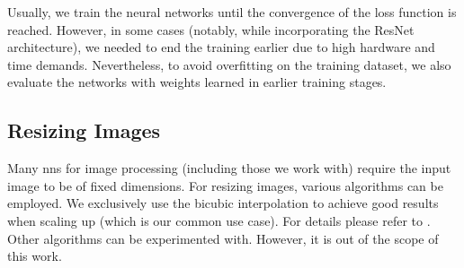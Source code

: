 Usually, we train the neural networks until the convergence of the loss function is reached. However, in some cases (notably, while incorporating the ResNet architecture), we needed to end the training earlier due to high hardware and time demands. Nevertheless, to avoid overfitting on the training dataset, we also evaluate the networks with weights learned in earlier training stages.

\subsection{Resizing Images}

Many \glspl{nn} for image processing (including those we work with) require the input image to be of fixed dimensions. For resizing images, various algorithms can be employed. We exclusively use the bicubic interpolation to achieve good results when scaling up (which is our common use case). For details please refer to \cite{keys1981cubic}. Other algorithms can be experimented with. However, it is out of the scope of this work.